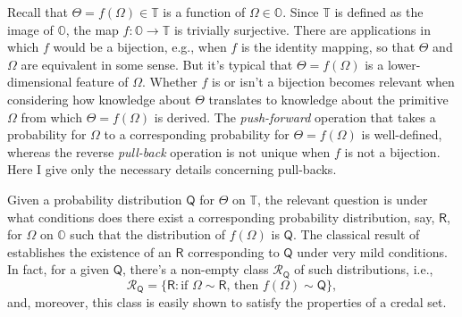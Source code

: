 \documentclass[a4paper, 12pt]{article}
\theoremstyle{plain}
\theoremstyle{definition}
\theoremstyle{remark}
\newcommand{\prob}{\mathsf{P}}
\newcommand{\OO}{\mathbb{O}}
\newcommand{\TT}{\mathbb{T}}
\newcommand{\prior}{\mathsf{Q}}
\newcommand{\pbcred}{\mathscr{R}}
\newcommand{\pb}{\mathsf{R}}
\begin{document}
Recall that $\Theta = f(\Omega) \in \TT$ is a function of $\Omega \in \OO$.  Since $\TT$ is defined as the image of $\OO$, the map $f: \OO \to \TT$ is trivially surjective.  There are applications in which $f$ would be a bijection, e.g., when $f$ is the identity mapping, so that $\Theta$ and $\Omega$ are equivalent in some sense.  
But it's typical that $\Theta = f(\Omega)$ is a lower-dimensional feature of $\Omega$.  Whether $f$ is or isn't a bijection becomes relevant when considering how knowledge about $\Theta$ translates to knowledge about the primitive $\Omega$ from which $\Theta=f(\Omega)$ is derived.  The {\em push-forward} operation that takes a probability for $\Omega$ to a corresponding probability for $\Theta=f(\Omega)$ is well-defined, whereas the reverse {\em pull-back} operation is not unique when $f$ is not a bijection.  Here I give only the necessary details concerning pull-backs. 



Given a probability distribution $\prior$ for $\Theta$ on $\TT$, the relevant question is under what conditions does there exist a corresponding probability distribution, say, $\pb$, for $\Omega$ on $\OO$ such that the distribution of $f(\Omega)$ is $\prior$.  The classical result of \citet[][Lemma~2.2]{varadarajan1963} establishes the existence of an $\pb$ corresponding to $\prior$ under very mild conditions.
In fact, for a given $\prior$, there's a non-empty class $\pbcred_\prior$ of such distributions, i.e., 
\begin{equation}
\label{eq:R.Q}
\pbcred_\prior = \{ \pb: \text{if $\Omega \sim \pb$, then $f(\Omega) \sim \prior$} \}, 
\end{equation}
and, moreover, this class is easily shown to satisfy the properties of a credal set.  
\end{document}
